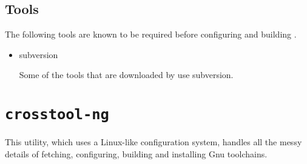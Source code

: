 \subsection{Tools}

The following tools are known to be required before configuring and
building \ctng.

\begin{itemize}
\item{subversion}

  Some of the tools that are downloaded by \ctng use subversion.

\end{itemize}

\section{\texttt{crosstool-ng}}

This utility, which uses a Linux-like configuration system, handles
all the messy details of fetching, configuring, building and
installing Gnu toolchains.

